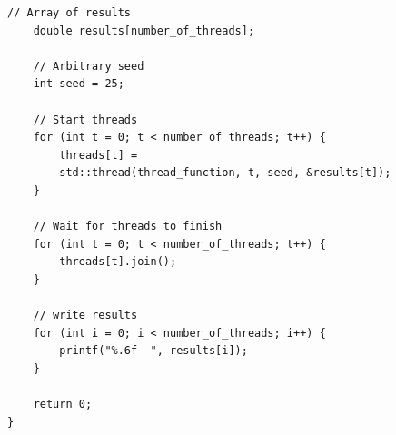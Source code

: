 \documentclass[11pt,a4paper,oneside,openright]{report}
\newcommand{\vspacesmall}{\vspace{3mm}}
\begin{document}
\begin{lstlisting}[frame=single]
    // Array of results
    double results[number_of_threads];

    // Arbitrary seed
    int seed = 25;

    // Start threads
    for (int t = 0; t < number_of_threads; t++) {
        threads[t] = 
        std::thread(thread_function, t, seed, &results[t]);
    }

    // Wait for threads to finish
    for (int t = 0; t < number_of_threads; t++) {
        threads[t].join();
    }

    // write results
    for (int i = 0; i < number_of_threads; i++) {     
        printf("%.6f  ", results[i]);
    }

    return 0;
}
\end{lstlisting}
\vspacesmall
\end{document}
